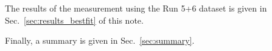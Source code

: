 The results of the measurement
using the Run 5+6 dataset is given in Sec.~\ref{sec:results_bestfit} of this note. 

Finally, a summary is given in Sec.~\ref{sec:summary}.  

\clearpage
